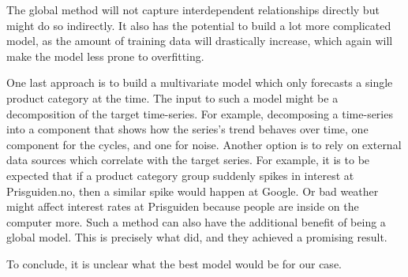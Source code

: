 The global method will not capture interdependent relationships directly
but might do so indirectly. It also has the potential to build a lot more complicated model,
as the amount of training data will drastically increase, which again will make the model less prone to
overfitting.

One last approach is to build a multivariate model which only forecasts a single product category at the time.
The input to such a model might be a decomposition of the target time-series.
For example, decomposing a time-series into a component that shows how the series's trend behaves over time,
one component for the cycles, and one for noise.
Another option is to rely on external data sources which correlate with the target series.
For example, it is to be expected that if a product category group suddenly spikes in interest at Prisguiden.no,
then a similar spike would happen at Google.
Or bad weather might affect interest rates at Prisguiden because people are inside on the computer more.
Such a method can also have the additional benefit of being a global model.
This is precisely what \cite{Laptev} did, and they achieved a promising result.

To conclude, it is unclear what the best model would be for our case.


